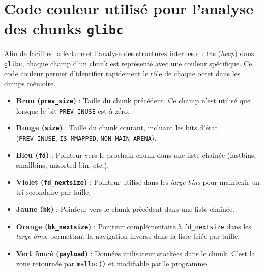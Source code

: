 \section*{Code couleur utilisé pour l'analyse des chunks \texttt{glibc}}

Afin de faciliter la lecture et l'analyse des structures internes du tas
(\textit{heap}) dans \texttt{glibc}, chaque champ d'un chunk est représenté
avec une couleur spécifique.
Ce code couleur permet d'identifier rapidement le rôle de chaque octet
dans les dumps mémoire.

\begin{itemize}
    \item \textcolor{pwndbgbrown}{\textbf{Brun (\texttt{prev\_size})}} :
          Taille du chunk précédent. Ce champ n'est utilisé que lorsque le bit
          \texttt{PREV\_INUSE} est à zéro.

    \item \textcolor{pwndbgred}{\textbf{Rouge (\texttt{size})}} :
          Taille du chunk courant, incluant les bits d'état
          (\texttt{PREV\_INUSE}, \texttt{IS\_MMAPPED}, \texttt{NON\_MAIN\_ARENA}).

    \item \textcolor{pwndbgblue}{\textbf{Bleu (\texttt{fd})}} :
          Pointeur vers le prochain chunk dans une liste chaînée
          (fastbins, smallbins, unsorted bin, etc.).

    \item \textcolor{pwndbgpurple}{\textbf{Violet (\texttt{fd\_nextsize})}} :
          Pointeur utilisé dans les \textit{large bins} pour maintenir un tri
          secondaire par taille.

    \item \textcolor{pwndbgyellow}{\textbf{Jaune (\texttt{bk})}} :
          Pointeur vers le chunk précédent dans une liste chaînée.

    \item \textcolor{pwndbgorange}{\textbf{Orange (\texttt{bk\_nextsize})}} :
          Pointeur complémentaire à \texttt{fd\_nextsize} dans les \textit{large bins},
          permettant la navigation inverse dans la liste triée par taille.

    \item \textcolor{pwndbgdarkgreen}{\textbf{Vert foncé (\texttt{payload})}} :
          Données utilisateur stockées dans le chunk.
          C'est la zone retournée par \texttt{malloc()} et modifiable par le programme.


\end{itemize}

